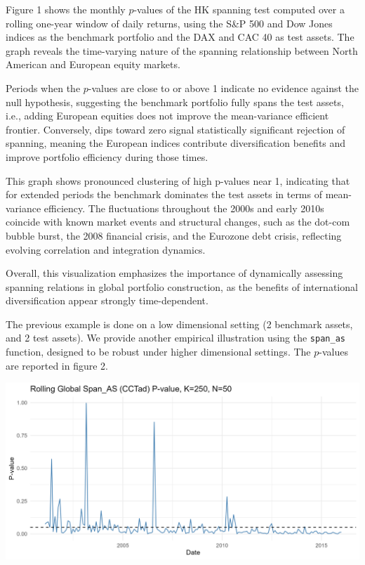 Figure 1 shows the monthly \(p\)-values of the HK spanning test computed
over a rolling one-year window of daily returns, using the S\&P 500 and
Dow Jones indices as the benchmark portfolio and the DAX and CAC 40 as
test assets. The graph reveals the time-varying nature of the spanning
relationship between North American and European equity markets.

Periods when the \(p\)-values are close to or above 1 indicate no evidence
against the null hypothesis, suggesting the benchmark portfolio fully
spans the test assets, i.e., adding European equities does not improve
the mean-variance efficient frontier. Conversely, dips toward zero
signal statistically significant rejection of spanning, meaning the
European indices contribute diversification benefits and improve
portfolio efficiency during those times.

This graph shows pronounced clustering of high p-values near 1,
indicating that for extended periods the benchmark dominates the test
assets in terms of mean-variance efficiency. The fluctuations throughout
the 2000s and early 2010s coincide with known market events and
structural changes, such as the dot-com bubble burst, the 2008 financial
crisis, and the Eurozone debt crisis, reflecting evolving correlation
and integration dynamics.

Overall, this visualization emphasizes the importance of dynamically
assessing spanning relations in global portfolio construction, as the
benefits of international diversification appear strongly
time-dependent.

The previous example is done on a low dimensional setting (2 benchmark
assets, and 2 test assets). We provide another empirical illustration
using the \texttt{span\_as} function, designed to be robust under higher
dimensional settings. The \(p\)-values are reported in figure 2.

\begin{center}\includegraphics[width=1\linewidth]{figures/fig_as_pvals_bigK_smallN} \end{center}

